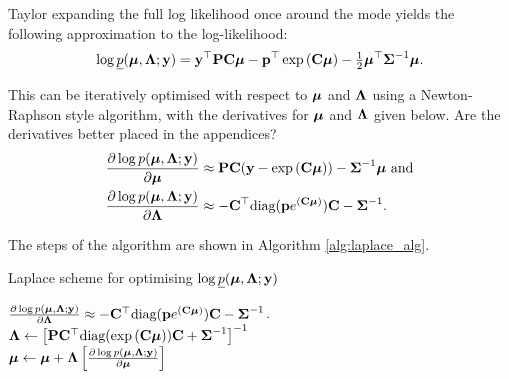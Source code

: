 \documentclass{amsart}[12pt]
\newcommand{\mgc}[1]{{\color{blue}#1}}
\begin{document}
		
		
	Taylor expanding the full log likelihood once around the mode yields the following approximation to 
	the	log-likelihood:
	\begin{align*}
		\log \underline{p}({\boldsymbol \mu}, {\boldsymbol \Lambda}; {\bf y}) = {\bf y}^\top{\bf P}{\bf C}{\boldsymbol\mu} - {\bf p}^\top\exp \left ({\bf C} {\boldsymbol \mu} \right ) - \tfrac{1}{2} {\boldsymbol \mu}^\top {\boldsymbol\Sigma}^{-1} {\boldsymbol \mu}. 
	\end{align*}
		
	\noindent This can be iteratively optimised with respect to ${\boldsymbol \mu}$ and ${\boldsymbol \Lambda}$ using a Newton-Raphson style
	algorithm, with the derivatives for ${\boldsymbol \mu}$ and ${\boldsymbol \Lambda}$ given below.
	\mgc{Are the derivatives better placed in the appendices?}
	\begin{align*}
		\frac{\partial \log p({\boldsymbol \mu}, {\boldsymbol \Lambda}; {\bf y})}{\partial {\boldsymbol\mu}}     & \approx {\bf P} {\bf C} ({\bf y} - \exp{({\bf C}{\boldsymbol\mu})}) - {\boldsymbol \Sigma}^{-1} {\boldsymbol \mu} \text{ and} \\
		\frac{\partial \log p({\boldsymbol \mu}, {\boldsymbol \Lambda}; {\bf y})}{\partial {\boldsymbol\Lambda}} & \approx - {\bf C}^\top \text{diag}({\bf p} e^{({\bf C} {\boldsymbol \mu})}) {\bf C} - {\boldsymbol \Sigma}^{-1}.   
	\end{align*}
		
	\noindent The steps of the algorithm are shown in Algorithm \ref{alg:laplace_alg}.
		
	\begin{algorithm}
		\caption{Laplace scheme for optimising $\log \underline{p}({\boldsymbol \mu}, {\boldsymbol \Lambda}; {\bf y})$}
		\label{alg:laplace_alg}
		\begin{algorithmic}
			\REQUIRE $\frac{\partial \log p({\boldsymbol \mu}, {\boldsymbol \Lambda}; {\bf y})}{\partial {\boldsymbol\Lambda}} \approx - {\bf C}^\top \text{diag}({\bf p} e^{({\bf C} {\boldsymbol \mu})}) {\bf C} - {\boldsymbol \Sigma}^{-1}$.
			\STATE ${\boldsymbol \Lambda} \leftarrow \left [{\bf P} {\bf C}^\top \text{diag}(\exp{({\bf C}{\boldsymbol\mu})}) {\bf C} + {\boldsymbol \Sigma}^{-1} \right ]^{-1}$ \\ [1ex] 
			\STATE ${\boldsymbol \mu} \leftarrow {\boldsymbol\mu} + {\boldsymbol \Lambda} \left [ \frac{\partial \log p({\boldsymbol \mu}, {\boldsymbol \Lambda}; {\bf y})}{\partial {\boldsymbol\mu}} \right ]$ \\ [1ex]
			\ENDWHILE
		\end{algorithmic}
	\end{algorithm}
		
\end{document}
